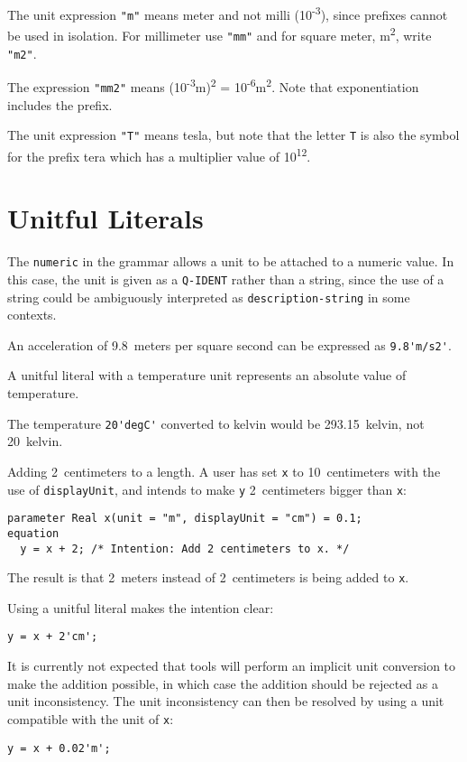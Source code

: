 \begin{example}
The unit expression \lstinline!"m"! means meter and not milli (10\textsuperscript{-3}), since prefixes cannot be used in isolation.
For millimeter use \lstinline!"mm"! and for square meter, m\textsuperscript{2}, write \lstinline!"m2"!.

The expression \lstinline!"mm2"! means (10\textsuperscript{-3}m)\textsuperscript{2} = 10\textsuperscript{-6}m\textsuperscript{2}.
Note that exponentiation includes the prefix.

The unit expression \lstinline!"T"! means tesla, but note that the letter \lstinline!T! is also the symbol for the prefix tera which has a multiplier value of 10\textsuperscript{12}.
\end{example}


\section{Unitful Literals}

The \lstinline[language=grammar]!numeric! in the grammar allows a unit to be attached to a numeric value.
In this case, the unit is given as a \lstinline[language=grammar]!Q-IDENT! rather than a string, since the use of a string could be ambiguously interpreted as \lstinline[language=grammar]!description-string! in some contexts.

\begin{example}
An acceleration of 9.8~meters per square second can be expressed as \lstinline!9.8'm/s2'!.
\end{example}

A unitful literal with a temperature unit represents an absolute value of temperature.

\begin{example}
The temperature \lstinline!20'degC'! converted to kelvin would be 293.15~kelvin, not 20~kelvin.
\end{example}

\begin{example}
Adding 2~centimeters to a length.
A user has set \lstinline!x! to 10~centimeters with the use of \lstinline!displayUnit!, and intends to make \lstinline!y! 2~centimeters bigger than \lstinline!x!:
\begin{lstlisting}[language=modelica]
  parameter Real x(unit = "m", displayUnit = "cm") = 0.1;
equation
  y = x + 2; /* Intention: Add 2 centimeters to x. */
\end{lstlisting}
The result is that 2~meters instead of 2~centimeters is being added to \lstinline!x!.

Using a unitful literal makes the intention clear:
\begin{lstlisting}[language=modelica]
  y = x + 2'cm';
\end{lstlisting}
It is currently not expected that tools will perform an implicit unit conversion to make the addition possible, in which case the addition should be rejected as a unit inconsistency.
The unit inconsistency can then be resolved by using a unit compatible with the unit of \lstinline!x!:
\begin{lstlisting}[language=modelica]
  y = x + 0.02'm';
\end{lstlisting}
\end{example}
